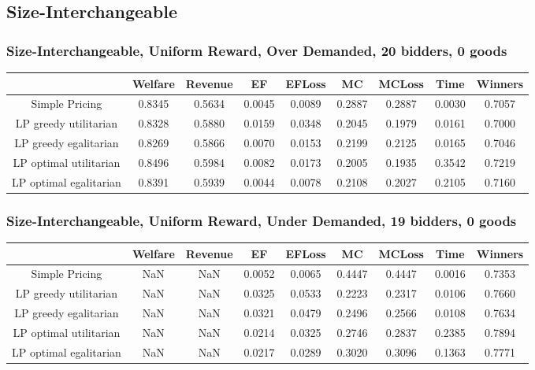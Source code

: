\subsection{Size-Interchangeable}
\subsubsection*{Size-Interchangeable, Uniform Reward, Over Demanded, 20 bidders, 0 goods} 
\begin{tabular}{|c|c|c|c|c|c|c|c|c|}\hline
                            	&Welfare	&Revenue	&EF	&EFLoss	&MC	&MCLoss	&Time	&Winners	\\\hline
                Simple Pricing	&0.8345	&0.5634	&0.0045	&0.0089	&0.2887	&0.2887	&0.0030	&0.7057	\\\hline 
         LP greedy utilitarian	&0.8328	&0.5880	&0.0159	&0.0348	&0.2045	&0.1979	&0.0161	&0.7000	\\\hline 
         LP greedy egalitarian	&0.8269	&0.5866	&0.0070	&0.0153	&0.2199	&0.2125	&0.0165	&0.7046	\\\hline 
        LP optimal utilitarian	&0.8496	&0.5984	&0.0082	&0.0173	&0.2005	&0.1935	&0.3542	&0.7219	\\\hline 
        LP optimal egalitarian	&0.8391	&0.5939	&0.0044	&0.0078	&0.2108	&0.2027	&0.2105	&0.7160	\\\hline 
\end{tabular}\subsubsection*{Size-Interchangeable, Uniform Reward, Under Demanded, 19 bidders, 0 goods} 
\begin{tabular}{|c|c|c|c|c|c|c|c|c|}\hline
                            	&Welfare	&Revenue	&EF	&EFLoss	&MC	&MCLoss	&Time	&Winners	\\\hline
                Simple Pricing	&NaN	&NaN	&0.0052	&0.0065	&0.4447	&0.4447	&0.0016	&0.7353	\\\hline 
         LP greedy utilitarian	&NaN	&NaN	&0.0325	&0.0533	&0.2223	&0.2317	&0.0106	&0.7660	\\\hline 
         LP greedy egalitarian	&NaN	&NaN	&0.0321	&0.0479	&0.2496	&0.2566	&0.0108	&0.7634	\\\hline 
        LP optimal utilitarian	&NaN	&NaN	&0.0214	&0.0325	&0.2746	&0.2837	&0.2385	&0.7894	\\\hline 
        LP optimal egalitarian	&NaN	&NaN	&0.0217	&0.0289	&0.3020	&0.3096	&0.1363	&0.7771	\\\hline 
\end{tabular}